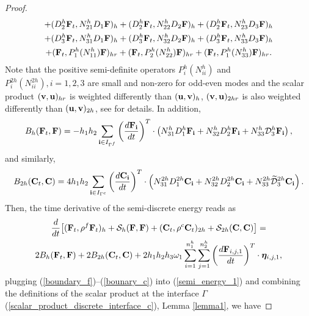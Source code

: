 \begin{proof}
\begin{multline*}
+  ({D}_2^{h}{\bf F}_t,{N}_{21}^{h}{D}_1{\bf F})_{h} 
+  ({D}_2^{h}{\bf F}_t,{N}_{22}^{h}{D}_2{\bf F})_{h} +  ({D}_2^{h}{\bf F}_t,{N}_{23}^{h}{D}_3{\bf F})_{h} \\
+  ({D}_3^{h}{\bf F}_t,{N}_{31}^{h}{D}_1{\bf F})_{h} 
+  ({D}_3^{h}{\bf F}_t,{N}_{32}^{h}{D}_2{\bf F})_{h} +  ({D}_3^{h}{\bf F}_t,{N}_{33}^{h}{D}_3{\bf F})_{h}\\
+ ({\bf F}_t, P^{h}_1(N_{11}^h){\bf F})_{hr} + ({\bf F}_t, P^{h}_2(N_{22}^h){\bf F})_{hr} + ({\bf F}_t, P^{h}_1(N_{33}^h){\bf F})_{hr}.
\end{multline*}
Note that the positive semi-definite operators $P_i^{h}(N_{ii}^{h})$ and $P_i^{2h}(N_{ii}^{2h}), i = 1,2,3$ are small and non-zero for odd-even modes and the scalar product $({\bf v}, {\bf u})_{hr}$ is weighted differently than $({\bf u}, {\bf v})_h$, $({\bf v}, {\bf u})_{2hr}$ is also weighted differently than $({\bf u}, {\bf v})_{2h}$, see \cite{sjogreen2012fourth, petersson2015wave} for details. In addition,
\begin{equation}\label{boundary_f}
B_h ({\bf F}_t,{\bf F}) = -h_1h_2\sum_{{\bf i}\in I_{\Gamma^f}}\left(\frac{d{\bf F}_{\bf i}}{dt}\right)^T\cdot\left({N}_{31}^h{D}_1^h {\bf F}_{\bf i}+ {N}_{32}^h{D}_2^h{\bf F}_{\bf i}+{N}_{33}^h\mathcal{D}_3^h{\bf F}_{\bf i}\right),
\end{equation}
and similarly, 
\begin{equation}\label{bounary_c}
B_{2h} ({\bf C}_t,{\bf C}) = 4h_1h_2\sum_{{\bf i}\in I_{\Gamma^c}}\left(\frac{d{\bf C}_{\bf i}}{dt}\right)^T\cdot\left({N}_{31}^{2h}{D}_1^{2h}{\bf C}_{\bf i}+{N}_{32}^{2h}{D}_2^{2h}{\bf C}_{\bf i}+{N}_{33}^{2h}\wt{\mathcal{D}}_3^{2h}{\bf C}_{\bf i}\right).
\end{equation}
Then, the time derivative of the semi-discrete energy reads as
\begin{multline}\label{semi_energy_1}
\frac{d}{dt}\big[({\bf F}_t,\rho^f {\bf F}_t)_h + \mathcal{S}_{h}({\bf F},{\bf F}) + ({\bf C}_t,\rho^{c} {\bf C}_t)_{2h} + \mathcal{S}_{2h}({\bf C},{\bf C}) \big]  = \\
2B_{h}({\bf F}_t,{\bf F}) + 2B_{2h}({\bf C}_t,{\bf C}) + 2h_1h_2h_3\omega_1\sum_{i = 1}^{n_1^h}\sum_{j=1}^{n_2^h}\left(\frac{d{\bf F}_{i,j,1}}{dt}\right)^T\cdot{\bm \eta}_{i,j,1},
\end{multline}
plugging (\ref{boundary_f})--(\ref{bounary_c}) into (\ref{semi_energy_1}) and combining the definitions of the scalar product at the interface $\Gamma$ (\ref{scalar_product_discrete_interface_c}), {\color{red}Lemma \ref{lemma1},} we have

\end{proof}
